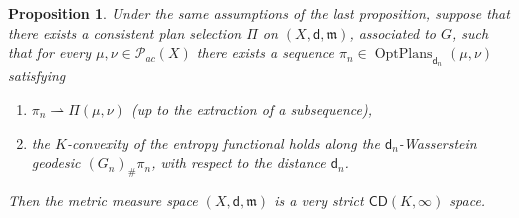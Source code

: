 \documentclass[11pt,twoside,a4paper]{article}
\newcommand{\weakto}{\rightharpoonup}
\newcommand{\CD}{\mathsf{CD}}
\newcommand{\di}{\mathsf d} %
\newcommand{\m}{\mathfrak m} %
\DeclareMathOperator{\OptPlans}{OptPlans}
\newcommand{\Prob}{\mathscr{P}}
\theoremstyle{theorem}
\newtheorem{prop}[theorem]{Proposition}
\theoremstyle{definition}
\theoremstyle{remark}
\theoremstyle{proof}
\begin{document}
\begin{prop}\label{prop:stabilitycompact}
Under the same assumptions of the last proposition, suppose that there exists a consistent plan selection $\Pi$ on $(X,\di,\m)$, associated to $G$, such that for every $\mu,\nu\in\Prob_{ac}(X)$ there exists a sequence $\pi_n\in \OptPlans_{\di_n}(\mu,\nu)$ satisfying
\begin{enumerate}
    \item $\pi_n \weakto \Pi(\mu,\nu)$ (up to the extraction of a subsequence),
    \item the $K$-convexity of the entropy functional holds along the $\di_n$-Wasserstein geodesic $(G_n)_\# \pi_n$, with respect to the distance $\di_n$.
\end{enumerate}
Then the metric measure space $(X,\di,\m)$ is a very strict $\CD(K,\infty)$ space.
\end{prop}
\end{document}
